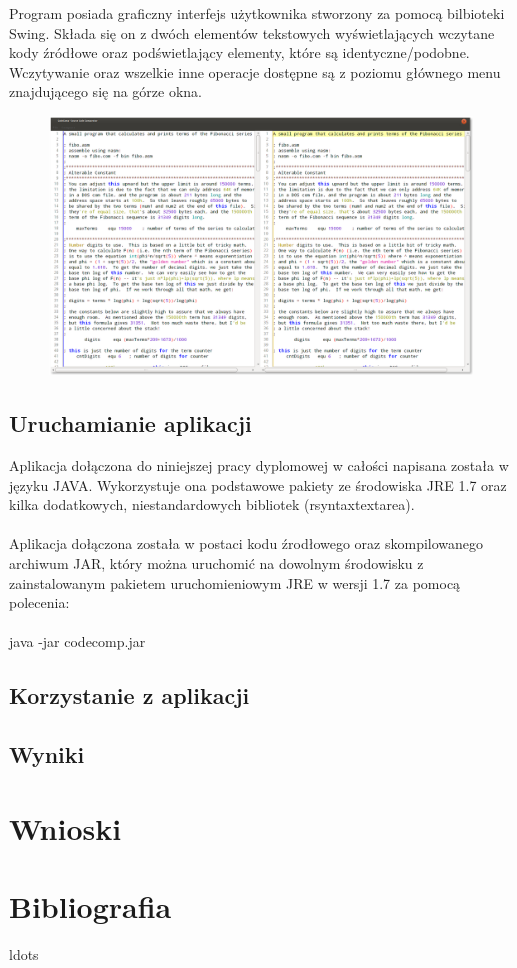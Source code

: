 \documentclass[a4paper,12pt]{article}
\begin{document}
\pagebreak

Program posiada graficzny interfejs użytkownika stworzony za pomocą bilbioteki Swing. Składa się on z dwóch elementów tekstowych wyświetlających wczytane kody źródłowe oraz podświetlający elementy, które są identyczne/podobne. Wczytywanie oraz wszelkie inne operacje dostępne są z poziomu głównego menu znajdującego się na górze okna.

\begin{figure}[!h]
\centering
\includegraphics[scale=0.33]{gfx/main_window.png}
\end{figure}

\newpage

\subsection{Uruchamianie aplikacji}

Aplikacja dołączona do niniejszej pracy dyplomowej w całości napisana została w języku JAVA. Wykorzystuje ona podstawowe pakiety ze środowiska JRE 1.7 oraz kilka dodatkowych, niestandardowych bibliotek (rsyntaxtextarea).
\\ \\
Aplikacja dołączona została w postaci kodu źrodłowego oraz skompilowanego archiwum JAR, który można uruchomić na dowolnym środowisku z zainstalowanym pakietem uruchomieniowym JRE w wersji 1.7 za pomocą polecenia:
\\ \\
java -jar codecomp.jar

\subsection{Korzystanie z aplikacji}

\subsection{Wyniki}

\section{Wnioski}

\newpage

\section{Bibliografia}

\begin{thebibliography}{1}

 ldots

\end{thebibliography}
\end{document}
